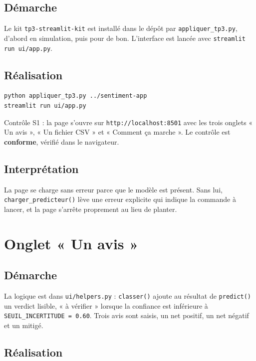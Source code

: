 \documentclass[11pt,a4paper]{article}
\begin{document}
\subsection{Démarche}

Le kit \texttt{tp3-streamlit-kit} est installé dans le dépôt par \texttt{appliquer\_tp3.py}, d'abord en simulation, puis pour de bon. L'interface est lancée avec \texttt{streamlit run ui/app.py}.

\subsection{Réalisation}

\begin{lstlisting}[language=bash]
python appliquer_tp3.py ../sentiment-app
streamlit run ui/app.py
\end{lstlisting}

Contrôle S1 : la page s'ouvre sur \texttt{http://localhost:8501} avec les trois onglets « Un avis », « Un fichier CSV » et « Comment ça marche ». Le contrôle est \textbf{conforme}, vérifié dans le navigateur.

\subsection{Interprétation}

La page se charge sans erreur parce que le modèle est présent. Sans lui, \texttt{charger\_predicteur()} lève une erreur explicite qui indique la commande à lancer, et la page s'arrête proprement au lieu de planter.

\section{Onglet « Un avis »}

\subsection{Démarche}

La logique est dans \texttt{ui/helpers.py} : \texttt{classer()} ajoute au résultat de \texttt{predict()} un verdict lisible, « à vérifier » lorsque la confiance est inférieure à \texttt{SEUIL\_INCERTITUDE = 0.60}. Trois avis sont saisis, un net positif, un net négatif et un mitigé.

\subsection{Réalisation}
\end{document}
